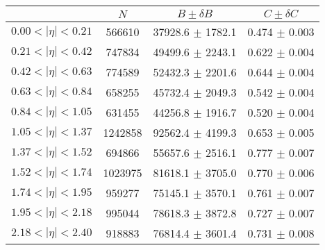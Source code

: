 \begin{tabular}{lccc}
\hline
    &   $N$   & $B \pm \delta B$  &  $C \pm \delta C$ \\
\hline
$0.00 < |\eta| <0.21$          & 566610     & 37928.6    $\pm$ 1782.1 & 0.474      $\pm$ 0.003 \\
$0.21 < |\eta| <0.42$          & 747834     & 49499.6    $\pm$ 2243.1 & 0.622      $\pm$ 0.004 \\
$0.42 < |\eta| <0.63$          & 774589     & 52432.3    $\pm$ 2201.6 & 0.644      $\pm$ 0.004 \\
$0.63 < |\eta| <0.84$          & 658255     & 45732.4    $\pm$ 2049.3 & 0.542      $\pm$ 0.004 \\
$0.84 < |\eta| <1.05$          & 631455     & 44256.8    $\pm$ 1916.7 & 0.520      $\pm$ 0.004 \\
$1.05 < |\eta| <1.37$          & 1242858    & 92562.4    $\pm$ 4199.3 & 0.653      $\pm$ 0.005 \\
$1.37 < |\eta| <1.52$          & 694866     & 55657.6    $\pm$ 2516.1 & 0.777      $\pm$ 0.007 \\
$1.52 < |\eta| <1.74$          & 1023975    & 81618.1    $\pm$ 3705.0 & 0.770      $\pm$ 0.006 \\
$1.74 < |\eta| <1.95$          & 959277     & 75145.1    $\pm$ 3570.1 & 0.761      $\pm$ 0.007 \\
$1.95 < |\eta| <2.18$          & 995044     & 78618.3    $\pm$ 3872.8 & 0.727      $\pm$ 0.007 \\
$2.18 < |\eta| <2.40$          & 918883     & 76814.4    $\pm$ 3601.4 & 0.731      $\pm$ 0.008 \\
\hline
\end{tabular}
